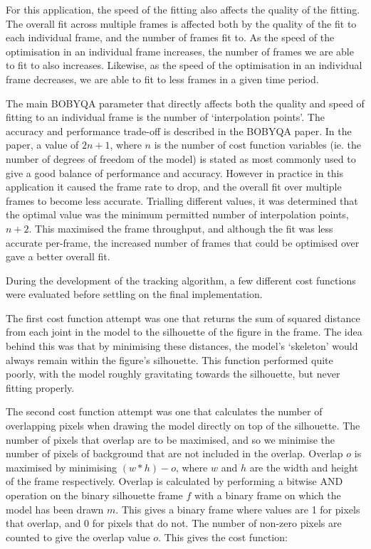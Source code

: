 For this application, the speed of the fitting also affects the quality of the fitting. The overall fit across multiple frames is affected both by the quality of the fit to each individual frame, and the number of frames fit to. As the speed of the optimisation in an individual frame increases, the number of frames we are able to fit to also increases. Likewise, as the speed of the optimisation in an individual frame decreases, we are able to fit to less frames in a given time period.

The main BOBYQA parameter that directly affects both the quality and speed of fitting to an individual frame is the number of `interpolation points'. The accuracy and performance trade-off is described in the BOBYQA paper\cite{bobyqa}. In the paper, a value of $2n + 1$, where $n$ is the number of cost function variables (ie. the number of degrees of freedom of the model) is stated as most commonly used to give a good balance of performance and accuracy. However in practice in this application it caused the frame rate to drop, and the overall fit over multiple frames to become less accurate. Trialling different values, it was determined that the optimal value was the minimum permitted number of interpolation points, $n + 2$. This maximised the frame throughput, and although the fit was less accurate per-frame, the increased number of frames that could be optimised over gave a better overall fit.

During the development of the tracking algorithm, a few different cost functions were evaluated before settling on the final implementation.

The first cost function attempt was one that returns the sum of squared distance from each joint in the model to the silhouette of the figure in the frame. The idea behind this was that by minimising these distances, the model's `skeleton' would always remain within the figure's silhouette. This function performed quite poorly, with the model roughly gravitating towards the silhouette, but never fitting properly.

The second cost function attempt was one that calculates the number of overlapping pixels when drawing the model directly on top of the silhouette. The number of pixels that overlap are to be maximised, and so we minimise the number of pixels of background that are not included in the overlap. Overlap $o$ is maximised by minimising $(w * h) - o$, where $w$ and $h$ are the width and height of the frame respectively. Overlap is calculated by performing a bitwise AND operation on the binary silhouette frame $f$ with a binary frame on which the model has been drawn $m$. This gives a binary frame where values are 1 for pixels that overlap, and 0 for pixels that do not. The number of non-zero pixels are counted to give the overlap value $o$. This gives the cost function:

